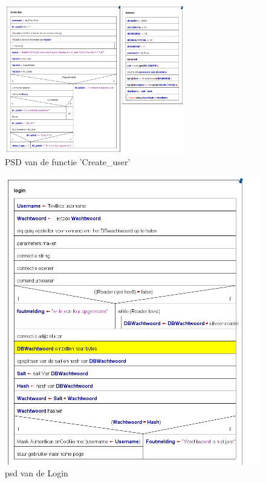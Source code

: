 \documentclass[11pt]{article}
\begin{document}
\newpage
\begin{figure}[h]
	\centering
	\includegraphics[width=0.7\textwidth]{cu}
	
	\caption{PSD van de functie 'Create\_user'}
	\label{PSDCU}
	
\end{figure}
\newpage
	\begin{figure}[h]
		\centering
		\includegraphics[scale=0.4]{Login}
		\caption{psd van de Login}
		\label{Login}
	\end{figure}
\end{document}
